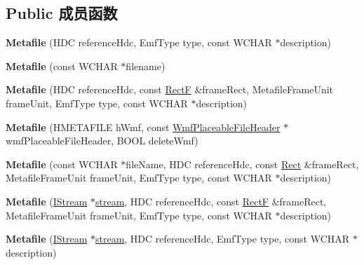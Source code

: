 \subsection*{Public 成员函数}
\begin{DoxyCompactItemize}
\item 
\mbox{\label{class_metafile_af3854474d02a0c68b2a0814369b4f929}} 
{\bfseries Metafile} (H\+DC reference\+Hdc, Emf\+Type type, const W\+C\+H\+AR $\ast$description)
\item 
\mbox{\label{class_metafile_a25f1b55c3486cd83c256202d1626756c}} 
{\bfseries Metafile} (const W\+C\+H\+AR $\ast$filename)
\item 
\mbox{\label{class_metafile_ac335f046012bccd802e661ebb1f07cf9}} 
{\bfseries Metafile} (H\+DC reference\+Hdc, const \hyperlink{struct_rect_f}{RectF} \&frame\+Rect, Metafile\+Frame\+Unit frame\+Unit, Emf\+Type type, const W\+C\+H\+AR $\ast$description)
\item 
\mbox{\label{class_metafile_a76e4f840810e25f42f5eda0fed38a011}} 
{\bfseries Metafile} (H\+M\+E\+T\+A\+F\+I\+LE h\+Wmf, const \hyperlink{struct_wmf_placeable_file_header}{Wmf\+Placeable\+File\+Header} $\ast$wmf\+Placeable\+File\+Header, B\+O\+OL delete\+Wmf)
\item 
\mbox{\label{class_metafile_a3244c603bcd7d7a13f417ce7c38e745a}} 
{\bfseries Metafile} (const W\+C\+H\+AR $\ast$file\+Name, H\+DC reference\+Hdc, const \hyperlink{struct_rect}{Rect} \&frame\+Rect, Metafile\+Frame\+Unit frame\+Unit, Emf\+Type type, const W\+C\+H\+AR $\ast$description)
\item 
\mbox{\label{class_metafile_ab677cf23fd1393fcd059cb4f7c18c0e0}} 
{\bfseries Metafile} (\hyperlink{interface_i_stream}{I\+Stream} $\ast$\hyperlink{structstream}{stream}, H\+DC reference\+Hdc, const \hyperlink{struct_rect_f}{RectF} \&frame\+Rect, Metafile\+Frame\+Unit frame\+Unit, Emf\+Type type, const W\+C\+H\+AR $\ast$description)
\item 
\mbox{\label{class_metafile_a49fe98f1cd6ac2025beb63b874e6283e}} 
{\bfseries Metafile} (\hyperlink{interface_i_stream}{I\+Stream} $\ast$\hyperlink{structstream}{stream}, H\+DC reference\+Hdc, Emf\+Type type, const W\+C\+H\+AR $\ast$description)

\end{DoxyCompactItemize}

